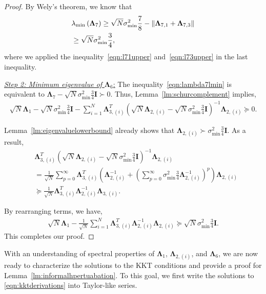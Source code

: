 \documentclass[twoside,11pt]{article}
\newcommand{\norm}[1]{\left\lVert#1\right\rVert}
\newcommand{\matI}{\mathbf{I}}
\newcommand{\matLambda}{\mathbf{\Lambda}}
\newcommand{\sms}{\sigma_{\min}^2}
\begin{document}
\begin{proof}
By Wely's theorem, we know that
\begin{align}
&\lambda_{\min}\left(\matLambda_{7}\right)\ge \sqrt{N}\sms \frac{7}{8} -\norm{\matLambda_{7,1}+\matLambda_{7,3}}\notag\\
&\ge \sqrt{N}\sms  \frac{3}{4},\label{eqn:lambda7lmin}
\end{align}
where we applied the inequality~\eqref{eqn:l71upper} and~\eqref{eqn:l73upper} in the last inequality.

\noindent\underline{\textit{Step 2: Minimum eigenvalue of} $\matLambda_6$:} The inequality~\eqref{eqn:lambda7lmin} is equivalent to $\matLambda_7-\sqrt{N}\sms  \frac{3}{4}\matI\succ 0$. Thus, Lemma~\ref{lm:schurcomplement} implies,
\begin{align*}
    \sqrt{N}\matLambda_1-\sqrt{N}\sms \frac{3}{4}\matI -\sum_{i=1}^N \matLambda_{3,(i)}^T\left(\sqrt{N}\matLambda_{2,(i)}-\sqrt{N}\sms \frac{3}{4}\matI\right)^{-1}\matLambda_{2,(i)}\succeq 0.
\end{align*}

Lemma~\ref{lm:eigenvaluelowerbound} already shows that $\matLambda_{2,(i)}\succ \sms\frac{3}{4}\matI$. As a result,
\begin{align*}
   &\matLambda_{3,(i)}^T\left(\sqrt{N}\matLambda_{2,(i)}-\sqrt{N}\sms \frac{3}{4}\matI\right)^{-1}\matLambda_{2,(i)} \\
   &=\frac{1}{\sqrt{N}}\sum_{p=0}^{\infty}\matLambda_{3,(i)}^T\left(\matLambda_{2,(i)}^{-1}+\left(\sum_{p=0}^{\infty}\sms \frac{3}{4}\matLambda_{2,(i)}^{-1}\right)^{p}\right)\matLambda_{2,(i)}\\
   &\succeq \frac{1}{\sqrt{N}}\matLambda_{3,(i)}^T\matLambda_{2,(i)}^{-1}\matLambda_{3,(i)}.
\end{align*}

By rearranging terms, we have,
\begin{align*}
    \sqrt{N}\matLambda_1 -\frac{1}{\sqrt{N}}\sum_{i=1}^N \matLambda_{3,(i)}^T\matLambda_{2,(i)}^{-1}\matLambda_{2,(i)}\succeq \sqrt{N}\sms \frac{3}{4}\matI.
\end{align*}
This completes our proof.
\end{proof}

With an understanding of spectral properties of $\matLambda_1$, $\matLambda_{2, (i)}$, and  $\matLambda_6$, we are now ready to characterize the solutions to the KKT conditions and provide a proof for Lemma~\ref{lm:informalhpertuabation}. To this goal, we first write the solutions to \eqref{eqn:kktderivations} into Taylor-like series.
\end{document}
